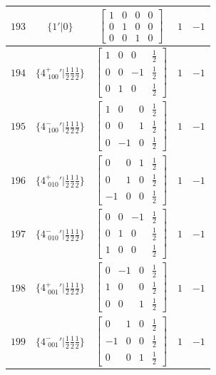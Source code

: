 \documentclass[fleqn,8pt]{jsarticle}
\begin{document}
\begin{longtable}{ccccc}
$ 193 $ & $ \{1{}'|0\} $ & $ \begin{bmatrix} 1 & 0 & 0 & 0 \\ 0 & 1 & 0 & 0 \\ 0 & 0 & 1 & 0 \end{bmatrix} $ & $ 1 $ & $ -1 $ \\ \hline
$ 194 $ & $ \{4^{+}_{\,\,100}{}'|\frac{1}{2} \frac{1}{2} \frac{1}{2}\} $ & $ \begin{bmatrix} 1 & 0 & 0 & \frac{1}{2} \\ 0 & 0 & -1 & \frac{1}{2} \\ 0 & 1 & 0 & \frac{1}{2} \end{bmatrix} $ & $ 1 $ & $ -1 $ \\ \hline
$ 195 $ & $ \{4^{-}_{\,\,100}{}'|\frac{1}{2} \frac{1}{2} \frac{1}{2}\} $ & $ \begin{bmatrix} 1 & 0 & 0 & \frac{1}{2} \\ 0 & 0 & 1 & \frac{1}{2} \\ 0 & -1 & 0 & \frac{1}{2} \end{bmatrix} $ & $ 1 $ & $ -1 $ \\ \hline
$ 196 $ & $ \{4^{+}_{\,\,010}{}'|\frac{1}{2} \frac{1}{2} \frac{1}{2}\} $ & $ \begin{bmatrix} 0 & 0 & 1 & \frac{1}{2} \\ 0 & 1 & 0 & \frac{1}{2} \\ -1 & 0 & 0 & \frac{1}{2} \end{bmatrix} $ & $ 1 $ & $ -1 $ \\ \hline
$ 197 $ & $ \{4^{-}_{\,\,010}{}'|\frac{1}{2} \frac{1}{2} \frac{1}{2}\} $ & $ \begin{bmatrix} 0 & 0 & -1 & \frac{1}{2} \\ 0 & 1 & 0 & \frac{1}{2} \\ 1 & 0 & 0 & \frac{1}{2} \end{bmatrix} $ & $ 1 $ & $ -1 $ \\ \hline
$ 198 $ & $ \{4^{+}_{\,\,001}{}'|\frac{1}{2} \frac{1}{2} \frac{1}{2}\} $ & $ \begin{bmatrix} 0 & -1 & 0 & \frac{1}{2} \\ 1 & 0 & 0 & \frac{1}{2} \\ 0 & 0 & 1 & \frac{1}{2} \end{bmatrix} $ & $ 1 $ & $ -1 $ \\ \hline
$ 199 $ & $ \{4^{-}_{\,\,001}{}'|\frac{1}{2} \frac{1}{2} \frac{1}{2}\} $ & $ \begin{bmatrix} 0 & 1 & 0 & \frac{1}{2} \\ -1 & 0 & 0 & \frac{1}{2} \\ 0 & 0 & 1 & \frac{1}{2} \end{bmatrix} $ & $ 1 $ & $ -1 $ \\ \hline

\end{longtable}
\end{document}
